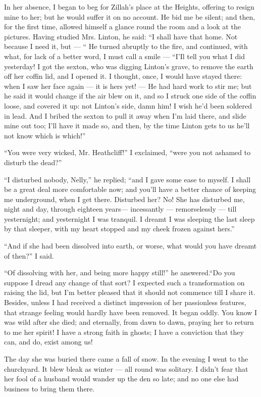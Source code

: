 \par In her absence, I began to beg for Zillah's place at the Heights, offering to resign mine to her; but he would suffer it on no account. He bid me be silent; and then, for the first time, allowed himself a glance round the room and a look at the pictures. Having studied Mrs. Linton, he said: “I shall have that home. Not because I need it, but — “ He turned abruptly to the fire, and continued, with what, for lack of a better word, I must call a smile — “I'Il tell you what I did yesterday! I got the sexton, who was digging Linton's grave, to remove the earth off her coffin lid, and I opened it. I thought, once, I would have stayed there: when I saw her face again — it is hers yet! — He had hard work to stir me; but he said it would change if the air blew on it, and so I struck one side of the coffin loose, and covered it up: not Linton's side, damn him! I wish he'd been soldered in lead. And I bribed the sexton to pull it away when I'm laid there, and slide mine out too; I'll have it made so, and then, by the time Linton gets to us he'll not know which is which!”
\par “You were very wicked, Mr. Heathcliff!” I exclaimed, “were you not ashamed to disturb the dead?”
\par “I disturbed nobody, Nelly,” he replied; “and I gave some ease to myself. I shall be a great deal more comfortable now; and you'll have a better chance of keeping me underground, when I get there. Disturbed her? No! She has disturbed me, night and day, through eighteen years— incessantly — remorselessly — till yesternight; and yesternight I was tranquil. I dreamt I was sleeping the last sleep by that sleeper, with my heart stopped and my cheek frozen against hers.”
\par “And if she had been dissolved into earth, or worse, what would you have dreamt of then?” I said.
\par “Of dissolving with her, and being more happy still!” he answered.“Do you suppose I dread any change of that sort? I expected such a transformation on raising the lid, but I'm better pleased that it should not commence till I share it. Besides, unless I had received a distinct impression of her passionless features, that strange feeling would hardly have been removed. It began oddly. You know I was wild after she died; and eternally, from dawn to dawn, praying her to return to me her spirit! I have a strong faith in ghosts; I have a conviction that they can, and do, exist among us!
\par The day she was buried there came a fall of snow. In the evening I went to the churchyard. It blew bleak as winter — all round was solitary. I didn't fear that her fool of a husband would wander up the den so late; and no one else had business to bring them there.
